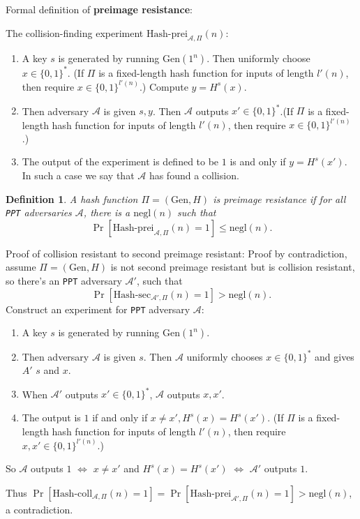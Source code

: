 \documentclass[a4paper]{article}
\newtheorem{definition}{Definition}
\newcommand{\negl}{\text{negl}}
\newcommand{\Gen}{\text{Gen}}
\newcommand{\hashsec}{\text{Hash-sec}}
\newcommand{\hashprei}{\text{Hash-prei}}
\newcommand{\hashcoll}{\text{Hash-coll}}
\newcommand{\A}{\mathcal{A}}
\newenvironment{problem}[2][Problem]{\begin{trivlist}
\item[\hskip \labelsep {\bfseries #1}\hskip \labelsep {\bfseries #2.}]}{\end{trivlist}}
\begin{document}
\begin{problem}{5.1}
Formal definition of \textbf{preimage resistance}:\par
The collision-finding experiment $\hashprei_{\A,\Pi}(n)$:\par\begin{enumerate}
    \item A key $s$ is generated by running $\Gen(1^n)$. Then uniformly choose $x\in\{0,1\}^*$. (If $\Pi$ is a fixed-length hash function for inputs of length $l'(n)$, then require $x\in\{0,1\}^{l'(n)}$.) Compute $y=H^s(x)$.
    \item Then adversary $\A$ is given $s,y$. Then $\A$ outputs $x'\in\{0,1\}^*$.(If $\Pi$ is a fixed-length hash function for inputs of length $l'(n)$, then require $x\in\{0,1\}^{l'(n)}$.)
    \item The output of the experiment is defined to be $1$ is and only if $y=H^s(x')$. In such a case we say that $\A$ has found a collision.
    \end{enumerate}
    \begin{definition}
    A hash function $\Pi=(\Gen,H)$ is preimage resistance if for all \texttt{PPT} adversaries $\A$, there is a $\negl(n)$ such that \[\Pr[\hashprei_{\A,\Pi}(n)=1]\le\negl(n).\]
    \end{definition}\par\vspace{3ex}
    
Proof of collision resistant to second preimage resistant: Proof by contradiction, assume $\Pi=(\Gen, H)$ is not second preimage resistant but is collision resistant, so there's an \texttt{PPT} adversary $\A'$, such that \[\Pr[\hashsec_{\A',\Pi}(n)=1]>\negl(n).\]
Construct an experiment for \texttt{PPT} adversary $\A$:
\begin{enumerate}
    \item A key $s$ is generated by running $\Gen(1^n)$.
    \item Then adversary $\A$ is given $s$. Then $\A$ uniformly chooses $x\in\{0,1\}^*$ and gives $A'$ $s$ and $x$.
    \item When $\A'$ outputs $x'\in\{0,1\}^*$, $\A$ outputs $x,x'$.
    \item The output is $1$ if and only if $x\ne x', H^s(x)=H^s(x')$.
    (If $\Pi$ is a fixed-length hash function for inputs of length $l'(n)$, then require $x,x'\in\{0,1\}^{l'(n)}$.)
\end{enumerate}
So $\A$ outputs $1$ $\Leftrightarrow$ $x\ne x'$ and $H^s(x)=H^s(x')$ $\Leftrightarrow$ $\A'$ outputs $1$.\par
Thus $\Pr[\hashcoll_{\A,\Pi}(n)=1]=\Pr[\hashprei_{\A',\Pi}(n)=1]>\negl(n)$, a contradiction.\par\vspace{3ex}


\end{problem}
\end{document}
